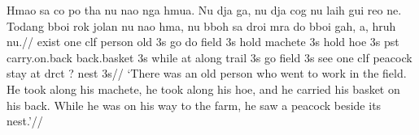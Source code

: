 \documentclass[12pt]{article}
\begin{document}
\ex[glftpos=right,glhangstyle=none,ssratio=.67,glspace=.6em minus .2em,
   sssep=.8em,ssrightskip=0pt plus .5em]
\begingl
\gla
Hmao sa co po tha  nu nao nga hmua. Nu dja ga, nu dja cog nu laih
gui reo ne. Todang bboi rok jolan nu nao hma, nu bboh sa droi mra
do bboi gah, a, hruh nu.//
\glb
exist one {clf} person old 3s go do field 3s hold machete 3s hold
hoe 3s pst carry.on.back back.basket 3s while at {along} trail 3s
go field 3s see one clf peacock stay at drct {?} nest 3s//
\glft
`There was an old person who went to work in the field. He took
along his machete, he took along his hoe, and he carried his
basket on his back. While he was on his way to the farm, he saw a
peacock beside its nest.'//
\endgl
\xe
\end{document}
